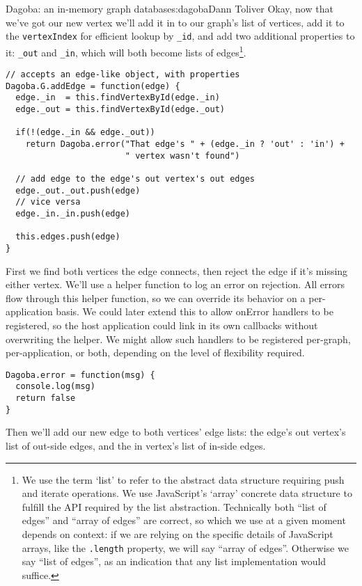 \begin{aosachapter}{Dagoba: an in-memory graph database}{s:dagoba}{Dann Toliver}
Okay, now that we've got our new vertex we'll add it in to our graph's
list of vertices, add it to the \texttt{vertexIndex} for efficient
lookup by \texttt{\_id}, and add two additional properties to it:
\texttt{\_out} and \texttt{\_in}, which will both become lists of
edges\footnote{We use the term `list' to refer to the abstract data
  structure requiring push and iterate operations. We use JavaScript's
  `array' concrete data structure to fulfill the API required by the
  list abstraction. Technically both ``list of edges'' and ``array of
  edges'' are correct, so which we use at a given moment depends on
  context: if we are relying on the specific details of JavaScript
  arrays, like the \texttt{.length} property, we will say ``array of
  edges''. Otherwise we say ``list of edges'', as an indication that any
  list implementation would suffice.}.

\begin{verbatim}
// accepts an edge-like object, with properties
Dagoba.G.addEdge = function(edge) {                     
  edge._in  = this.findVertexById(edge._in)
  edge._out = this.findVertexById(edge._out)
  
  if(!(edge._in && edge._out)) 
    return Dagoba.error("That edge's " + (edge._in ? 'out' : 'in') + 
                        " vertex wasn't found")

  // add edge to the edge's out vertex's out edges
  edge._out._out.push(edge)                             
  // vice versa
  edge._in._in.push(edge)                               
  
  this.edges.push(edge)
}
\end{verbatim}

First we find both vertices the edge connects, then reject the edge if
it's missing either vertex. We'll use a helper function to log an error
on rejection. All errors flow through this helper function, so we can
override its behavior on a per-application basis. We could later extend
this to allow onError handlers to be registered, so the host application
could link in its own callbacks without overwriting the helper. We might
allow such handlers to be registered per-graph, per-application, or
both, depending on the level of flexibility required.

\begin{verbatim}
Dagoba.error = function(msg) {
  console.log(msg)
  return false 
}
\end{verbatim}

Then we'll add our new edge to both vertices' edge lists: the edge's out
vertex's list of out-side edges, and the in vertex's list of in-side
edges.


\end{aosachapter}
